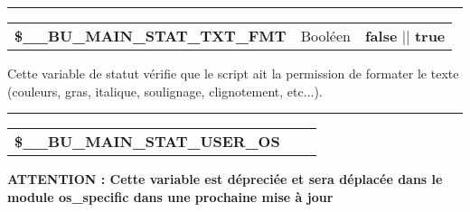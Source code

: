 \documentclass[a4paper,10pt]{article}
\begin{document}

    \par\noindent\rule{\textwidth}{0.4pt}

    \begin{justify}
        \begin{tabular}{l|l|l}
            \textbf{\color{vars}\$\_\_BU\_MAIN\_STAT\_TXT\_FMT}   & Booléen & \textbf{false} || \textbf{true}\\[1\baselineskip]
        \end{tabular}
    \end{justify}

    \begin{justify}
        Cette variable de statut vérifie que le script ait la permission de formater le texte (couleurs, gras, italique, soulignage, clignotement, etc...).
    \end{justify}


    \par\noindent\rule{\textwidth}{0.4pt}

    \begin{justify}
        \begin{tabular}{l|l|l}
            \textbf{\color{vars}\$\_\_BU\_MAIN\_STAT\_USER\_OS}   & &\\[1\baselineskip]
        \end{tabular}
    \end{justify}

    \begin{justify}
        \textbf{ATTENTION : Cette variable est dépreciée et sera déplacée dans le module \textbf{\color{path}os\_specific} dans une prochaine mise à jour}
    \end{justify}
\end{document}
